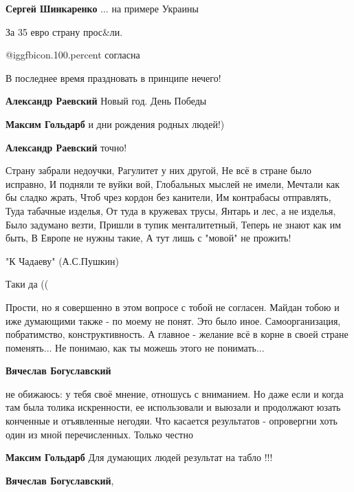 \begin{itemize}
\textbf{Сергей Шинкаренко} ... на примере Украины

За 35 евро страну прос\&ли.

 @igg{fbicon.100.percent}  согласна

В последнее время праздновать в принципе нечего!

\begin{itemize} %
\textbf{Александр Раевский} Новый год. День Победы

\textbf{Максим Гольдарб} и дни рождения родных людей!)

\textbf{Александр Раевский} точно!
\end{itemize} %


\obeycr
Страну забрали недоучки,
Рагулитет у них другой,
Не всё в стране было исправно,
И подняли те вуйки вой,
Глобальных мыслей не имели,
Мечтали как бы сладко жрать,
Чтоб чрез кордон без канители,
Им контрабасы отправлять,
Туда табачные изделья,
От туда в кружевах трусы,
Янтарь и лес, а не изделья,
Было задумано везти,
Пришли в тупик менталитетный,
Теперь не знают как им быть,
В Европе не нужны такие,
А тут лишь с "мовой" не прожить!
\restorecr


"К Чадаеву"
(А.С.Пушкин)

Таки да ((


Прости, но я совершенно в этом вопросе с тобой не согласен. Майдан тобою и иже
думающими также - по моему не понят. Это было иное. Самоорганизация,
побратимство, конструктивность. А главное - желание всё в корне в своей стране
поменять... Не понимаю, как ты можешь этого не понимать...

\begin{itemize} %
\textbf{Вячеслав Богуславский} 

не обижаюсь: у тебя своё мнение, отношусь с вниманием. Но даже если и когда там
была толика искренности, ее использовали и выюзали и продолжают юзать конченные
и отъявленные негодяи. Что касается результатов - опровергни хоть один из мной
перечисленных. Только честно

\textbf{Максим Гольдарб} Для думающих людей результат на табло !!!

\textbf{Вячеслав Богуславский}, 


\end{itemize}
\end{itemize}
